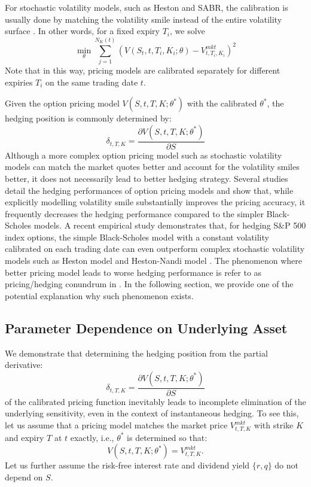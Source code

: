\documentclass[letterpaper,12pt,titlepage,oneside,final]{book}
\numberwithin{equation}{section}
\theoremstyle{definition}
\newcommand{\Vmkt}{V^{mkt}}
\begin{document}
For stochastic volatility models, such as Heston and SABR, the calibration is usually done by matching the volatility smile instead of the entire volatility surface \cite{heston1993closed,hagan2002managing,hulloptimal}. In other words, for a fixed expiry $T_i$, we solve
\[
\min_{\theta} \sum_{j=1}^{N_K(t)} \left(V(S_t,t,T_i,K_i;\theta)-\Vmkt_{t,T_i,K_i}\right)^2
\]
Note that in this way, pricing models are calibrated separately for different expiries $T_i$  on the same trading date $t$.

Given the option pricing model $V(S,t,T,K;\theta^*)$ with the calibrated $\theta^*$, the hedging position is commonly determined by:
\[
\delta_{t,T,K}=  \frac{\partial V(S,t,T,K;\theta^*)}{\partial S}
\]
Although a more complex option pricing model such as stochastic volatility models can match the market quotes better and account for the volatility smiles better, it does not necessarily lead to better hedging strategy. 
Several studies \cite{dumas1998implied,bakshi1997empirical,yung2003empirical, lassance2018comparison} detail the hedging performances of option pricing models and show that, while explicitly
modelling volatility smile substantially improves the pricing
accuracy, it frequently decreases the hedging
performance compared to the simpler  Black-Scholes models. A recent empirical study \cite{lassance2018comparison} demonstrates that, for hedging S\&P 500 index options, the simple Black-Scholes model with a constant volatility calibrated on each trading date can even outperform complex stochastic volatility models such as Heston model \cite{heston1993closed} and Heston-Nandi model \cite{heston2000closed}. The phenomenon where better pricing model leads to worse hedging performance is refer to as pricing/hedging conundrum in \cite{lassance2018comparison}. In the following section, we provide one of the potential explanation why such phenomenon exists.

\subsection{Parameter Dependence on Underlying Asset}
\label{sec：dependence}
We demonstrate that determining the hedging position from the partial derivative:
\[
\delta_{t,T,K}=  \frac{\partial V(S,t,T,K;\theta^*)}{\partial S}
\] of the calibrated pricing function inevitably leads to incomplete elimination of the underlying sensitivity, even in the context of instantaneous hedging. 
To see this,
let us assume that a pricing model matches the market price $\Vmkt_{t,T,K}$ with strike $K$ and expiry $T$  at $t$ exactly, i.e., $\theta^*$ is determined so that:
\begin{equation} \label{eq:imp}
     V(S,t,T,K;\theta^*)=\Vmkt_{t,T,K}.
\end{equation} 
Let us further assume the risk-free interest rate and dividend yield $\{r,q\}$ do not depend on $S$. 
\end{document}
